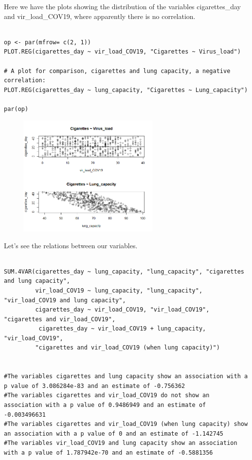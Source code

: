 \documentclass{article}
\begin{document}
Here we have the plots showing the distribution of the variables cigarettes\_day and vir\_load\_COV19, where apparently there is no correlation.

\begin{lstlisting}

op <- par(mfrow= c(2, 1))
PLOT.REG(cigarettes_day ~ vir_load_COV19, "Cigarettes ~ Virus_load")

# A plot for comparison, cigarettes and lung capacity, a negative correlation:
PLOT.REG(cigarettes_day ~ lung_capacity, "Cigarettes ~ Lung_capacity")

par(op)

\end{lstlisting}

\begin{figure}[h]
\includegraphics[width=7cm]{PLOT_cig_vir_lung.png}
\centering
\end{figure}

Let's see the relations between our variables.

\begin{lstlisting}

SUM.4VAR(cigarettes_day ~ lung_capacity, "lung_capacity", "cigarettes and lung capacity",
         vir_load_COV19 ~ lung_capacity, "lung_capacity", "vir_load_COV19 and lung capacity",
         cigarettes_day ~ vir_load_COV19, "vir_load_COV19", "cigarettes and vir_load_COV19",
          cigarettes_day ~ vir_load_COV19 + lung_capacity, "vir_load_COV19",
         "cigarettes and vir_load_COV19 (when lung capacity)")


#The variables cigarettes and lung capacity show an association with a p value of 3.086284e-83 and an estimate of -0.756362 
#The variables cigarettes and vir_load_COV19 do not show an association with a p value of 0.9486949 and an estimate of -0.003496631 
#The variables cigarettes and vir_load_COV19 (when lung capacity) show an association with a p value of 0 and an estimate of -1.142745 
#The variables vir_load_COV19 and lung capacity show an association with a p value of 1.787942e-70 and an estimate of -0.5881356 

\end{lstlisting}
\end{document}
